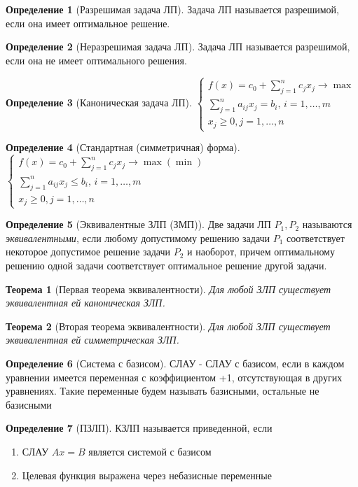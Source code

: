 \documentclass[a4paper]{article}
\newtheorem{theorem}{Теорема}[section]
\theoremstyle{definition}
\newtheorem*{definition}{Определение}
\theoremstyle{remark}
\begin{document}
\begin{definition}[Разрешимая задача ЛП]
	Задача ЛП называется разрешимой, если она имеет оптимальное решение.
\end{definition}
\begin{definition}[Неразрешимая задача ЛП]
	Задача ЛП называется разрешимой, если она не имеет оптимального решения.
\end{definition}
\begin{definition}[Каноническая задача ЛП]
		$\begin{cases}
			f(x) = c_0 + \sum_{j = 1}^n c_j x_j \to \max\\
			\sum_{j = 1}^{n} a_{ij}x_j =b_i, \, i = 1, \dots, m \\ 
			x_j \geq 0, j = 1, \dots, n
		\end{cases}$
\end{definition}
\begin{definition}[Стандартная (симметричная) форма]
    $\begin{cases}
        f(x) = c_0 + \sum_{j = 1}^n c_j x_j \to \max (\min) \\
        \sum_{j = 1}^{n} a_{ij}x_j \leq b_i, \, i = 1, \dots, m \\ 
        x_j \geq 0, j = 1, \dots, n
    \end{cases}$
\end{definition}
\begin{definition}[Эквивалентные ЗЛП (ЗМП)]
	Две задачи ЛП $P_1, P_2$ называются \textit{эквивалентными}, если любому допустимому решению задачи $P_1$ соответствует некоторое допустимое решение задачи $P_2$ и наоборот, причем оптимальному решению одной задачи соответствует оптимальное решение другой задачи.
\end{definition}
\begin{theorem}[Первая теорема эквивалентности]
	Для любой ЗЛП существует эквивалентная ей каноническая ЗЛП.
\end{theorem}
\begin{theorem}[Вторая теорема эквивалентности]
	Для любой ЗЛП существует эквивалентная ей симметрическая ЗЛП.
\end{theorem}
\begin{definition}[Система с базисом]
	СЛАУ - СЛАУ с базисом, если в каждом уравнении имеется переменная с коэффициентом +1, отсутствующая в других уравнениях. Такие переменные будем называть базисными, остальные не базисными
\end{definition}
\begin{definition}[ПЗЛП]
	КЗЛП называется приведенной, если
	\begin{enumerate}
		\item СЛАУ $Ax = B$ является системой с базисом
		\item Целевая функция выражена через небазисные переменные
	\end{enumerate}
\end{definition}
\end{document}
